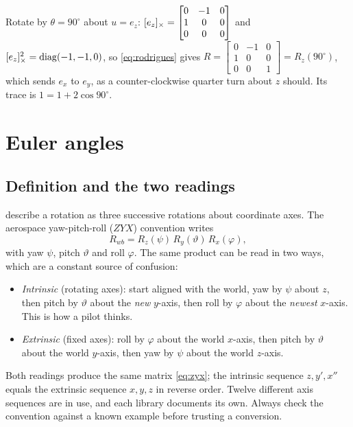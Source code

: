 \begin{worked}
Rotate by $\theta = 90^\circ$ about $u = e_z$: $[e_z]_{\times} = \begin{bmatrix}0 & -1 & 0\\1 & 0 & 0\\0 & 0 & 0\end{bmatrix}$ and
$[e_z]_{\times}^2 = \operatorname{diag}(-1, -1, 0)$, so \eqref{eq:rodrigues} gives $R = \begin{bmatrix}0 & -1 & 0\\ 1 & 0 & 0\\ 0 & 0 & 1\end{bmatrix} = R_z(90^\circ)$, which
sends $e_x$ to $e_y$, as a counter-clockwise quarter turn about $z$ should. Its trace is $1 = 1 + 2\cos90^\circ$.
\end{worked}

\section{Euler angles}

\subsection{Definition and the two readings}

 describe a rotation as three successive rotations about coordinate axes. The aerospace yaw-pitch-roll ($ZYX$)
convention writes
\begin{equation}
  R_{wb} = R_z(\psi)\,R_y(\vartheta)\,R_x(\varphi),
  \label{eq:zyx}
\end{equation}
with yaw $\psi$, pitch $\vartheta$ and roll $\varphi$. The same product can be read in two ways, which are a constant source of confusion:
\begin{itemize}
  \item \emph{Intrinsic} (rotating axes): start aligned with the world, yaw by $\psi$ about $z$, then pitch by $\vartheta$ about the \emph{new} $y$-axis,
        then roll by $\varphi$ about the \emph{newest} $x$-axis. This is how a pilot thinks.
  \item \emph{Extrinsic} (fixed axes): roll by $\varphi$ about the world $x$-axis, then pitch by $\vartheta$ about the world $y$-axis, then yaw by $\psi$ about
        the world $z$-axis.
\end{itemize}
Both readings produce the same matrix \eqref{eq:zyx}; the intrinsic sequence $z, y', x''$ equals the extrinsic sequence $x, y, z$ in reverse
order. Twelve different axis sequences are in use, and each library documents its own. Always check the convention against a known example
before trusting a conversion.


